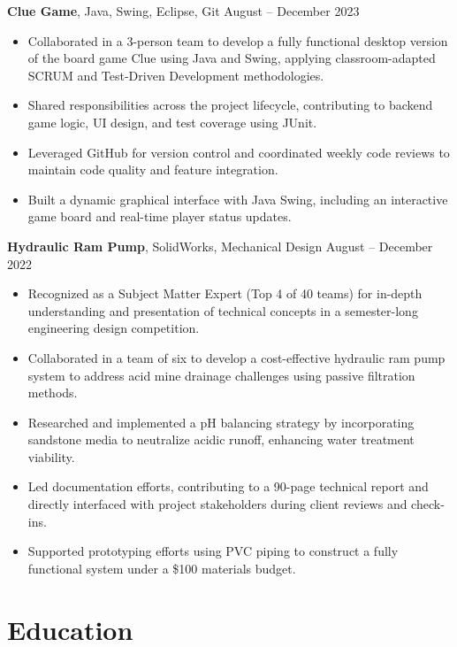\documentclass[11pt]{article}       %
\begin{document}
\textbf{Clue Game}, Java, Swing, Eclipse, Git \hfill August -- December 2023
\vspace{-6pt}
\begin{itemize}
  \item Collaborated in a 3-person team to develop a fully functional desktop version of the board game Clue using Java and Swing, applying classroom-adapted SCRUM and Test-Driven Development methodologies.
  \item Shared responsibilities across the project lifecycle, contributing to backend game logic, UI design, and test coverage using JUnit.
  \item Leveraged GitHub for version control and coordinated weekly code reviews to maintain code quality and feature integration.
  \item Built a dynamic graphical interface with Java Swing, including an interactive game board and real-time player status updates.
\end{itemize}

\textbf{Hydraulic Ram Pump}, SolidWorks, Mechanical Design \hfill August -- December 2022
\vspace{-6pt}
\begin{itemize}
  \item Recognized as a Subject Matter Expert (Top 4 of 40 teams) for in-depth understanding and presentation of technical concepts in a semester-long engineering design competition.
  \item Collaborated in a team of six to develop a cost-effective hydraulic ram pump system to address acid mine drainage challenges using passive filtration methods.
  \item Researched and implemented a pH balancing strategy by incorporating sandstone media to neutralize acidic runoff, enhancing water treatment viability.
  \item Led documentation efforts, contributing to a 90-page technical report and directly interfaced with project stakeholders during client reviews and check-ins.
  \item Supported prototyping efforts using PVC piping to construct a fully functional system under a \$100 materials budget.
\end{itemize}


\vspace{-12pt}
\section*{Education}
\vspace{3pt}
\end{document}
